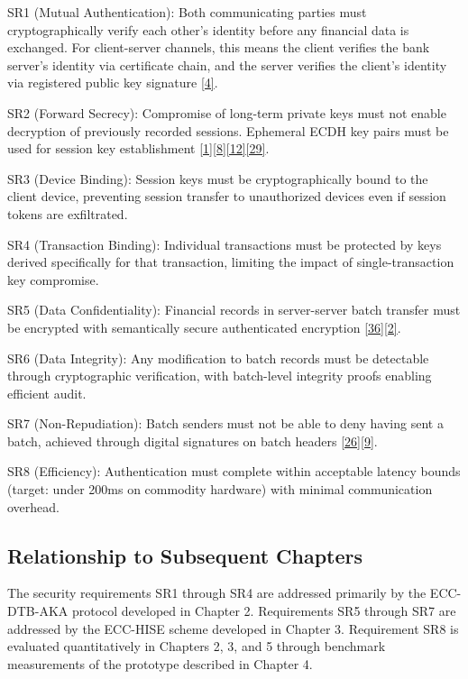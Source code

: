 \indent SR1 (Mutual Authentication): Both communicating parties must cryptographically verify each other's identity before any financial data is exchanged. For client-server channels, this means the client verifies the bank server's identity via certificate chain, and the server verifies the client's identity via registered public key signature \hyperref[ref:4]{[4]}.

\indent SR2 (Forward Secrecy): Compromise of long-term private keys must not enable decryption of previously recorded sessions. Ephemeral ECDH key pairs must be used for session key establishment \hyperref[ref:1]{[1]}\hyperref[ref:8]{[8]}\hyperref[ref:12]{[12]}\hyperref[ref:29]{[29]}.

\indent SR3 (Device Binding): Session keys must be cryptographically bound to the client device, preventing session transfer to unauthorized devices even if session tokens are exfiltrated.

\indent SR4 (Transaction Binding): Individual transactions must be protected by keys derived specifically for that transaction, limiting the impact of single-transaction key compromise.

\indent SR5 (Data Confidentiality): Financial records in server-server batch transfer must be encrypted with semantically secure authenticated encryption \hyperref[ref:36]{[36]}\hyperref[ref:2]{[2]}.

\indent SR6 (Data Integrity): Any modification to batch records must be detectable through cryptographic verification, with batch-level integrity proofs enabling efficient audit.

\indent SR7 (Non-Repudiation): Batch senders must not be able to deny having sent a batch, achieved through digital signatures on batch headers \hyperref[ref:26]{[26]}\hyperref[ref:9]{[9]}.

\indent SR8 (Efficiency): Authentication must complete within acceptable latency bounds (target: under 200ms on commodity hardware) with minimal communication overhead.

\subsection{Relationship to Subsequent Chapters}

\indent The security requirements SR1 through SR4 are addressed primarily by the ECC-DTB-AKA protocol developed in Chapter 2. Requirements SR5 through SR7 are addressed by the ECC-HISE scheme developed in Chapter 3. Requirement SR8 is evaluated quantitatively in Chapters 2, 3, and 5 through benchmark measurements of the prototype described in Chapter 4.

